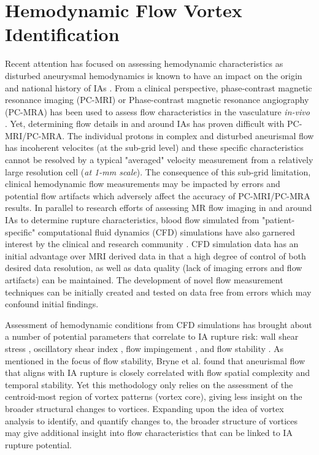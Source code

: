 \cleartooddpage[\thispagestyle{empty}]
\chapter{Hemodynamic Flow Vortex Identification}\label{CHAPTER2}

Recent attention has focused on assessing hemodynamic characteristics as disturbed aneurysmal hemodynamics is known to have an impact on the origin and national history of IAs \cite{weir2002unruptured,brisman2006cerebral}. From a clinical perspective, phase-contrast magnetic resonance imaging (PC-MRI) or Phase-contrast magnetic resonance angiography (PC-MRA) has been used to assess flow characteristics in the vasculature \textit{in-vivo} \cite{benndorf1996intraaneurysmal,meckel2008vivo}. Yet, determining flow details in and around IAs has proven difficult with PC-MRI/PC-MRA. The individual protons in complex and disturbed aneurismal flow has incoherent velocites (at the sub-grid level) and these specific characteristics cannot be resolved by a typical "averaged" velocity measurement from a relatively large resolution cell (\textit{at 1-mm scale}). The consequence of this sub-grid limitation, clinical hemodynamic flow measurements may be impacted by errors and potential flow artifacts which adversely affect the accuracy of PC-MRI/PC-MRA results. In parallel to research efforts of assessing MR flow imaging in and around IAs to determine rupture characteristics, blood flow simulated from "patient-specific" computational fluid dynamics (CFD) simulations \cite{steinman2002image} have also garnered interest by the clinical and research community \cite{xiang2011hemodynamic,cebral2011association}. CFD simulation data has an initial advantage over MRI derived data in that a high degree of control of both desired data resolution, as well as data quality (lack of imaging errors and flow artifacts) can be maintained. The development of novel flow measurement techniques can be initially created and tested on data free from errors which may confound initial findings.

Assessment of hemodynamic conditions from CFD simulations has brought about a number of potential parameters that correlate to IA rupture risk: wall shear stress \cite{baek2009flow}, oscillatory shear index \cite{steinman2003image}, flow impingement \cite{cebral2011association}, and flow stability \cite{byrne2014quantifying}. As mentioned in the focus of flow stability, Bryne et al. \cite{byrne2014quantifying} found that aneurismal flow that aligns with IA rupture is closely correlated with flow spatial complexity and temporal stability. Yet this methodology only relies on the assessment of the centroid-most region of vortex patterns (vortex core), giving less insight on the broader structural changes to vortices. Expanding upon the idea of vortex analysis to identify, and quantify changes to, the broader structure of vortices may give additional insight into flow characteristics that can be linked to IA rupture potential.

